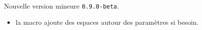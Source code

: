 Nouvelle version mineure \verb+0.9.0-beta+.

\begin{itemize}[itemsep=.5em]
    \item {}
          la macro  ajoute des espaces autour des paramètres si besoin.
    
\end{itemize}

\separation